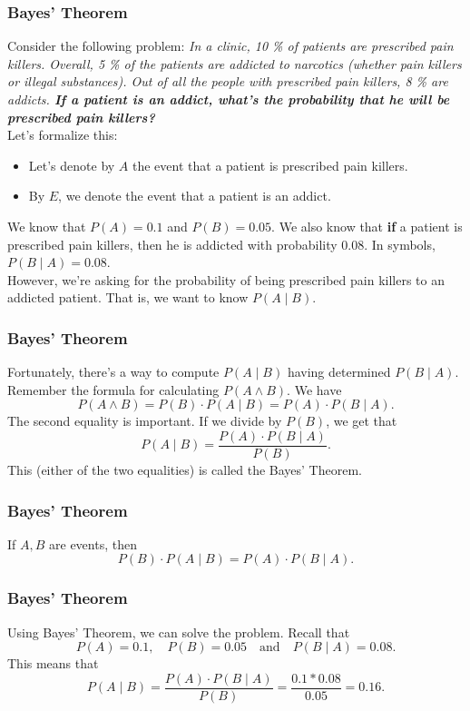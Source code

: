 \documentclass[aspectratio=169,11pt,usenames,dvipsnames,handout]{beamer}
\begin{document}
\begin{frame}
 \frametitle{Bayes' Theorem}
 Consider the following problem:
 \emph{In a clinic, 10 \% of patients are prescribed pain killers. Overall, 5 \%
  of the patients are addicted to narcotics (whether pain killers or illegal
  substances). Out of all the people with prescribed pain killers, 8 \% are
  addicts. \textbf{If a patient is an addict, what's the probability that he
  will be prescribed pain killers?}}\\
  \pause
  Let's formalize this:
  \begin{itemize}
   \item Let's denote by $A$ the event that a patient is prescribed pain
    killers.
   \pause
   \item By $E$, we denote the event that a patient is an addict.
  \end{itemize}
  We know that $P(A) = 0.1$ and $P(B) = 0.05$. \pause
  We also know that \textbf{if} a patient is prescribed pain killers, then he is
  addicted with probability 0.08. In symbols, $P(B \mid A) = 0.08$.\\\pause
  However, we're asking for the probability of being prescribed pain killers to
  an addicted patient. That is, we want to know $P(A \mid B)$.
\end{frame}
\begin{frame}
 \frametitle{Bayes' Theorem}
 Fortunately, there's a way to compute $P(A \mid B)$ having determined $P(B \mid
 A)$.\\
 \pause
 Remember the formula for calculating $P(A \wedge B)$. We have
 \[
  P(A \wedge B) = P(B) \cdot P(A \mid B) = P(A) \cdot P(B \mid A).
 \]
 \pause
 The second equality is important. If we divide by $P(B)$, we get that
 \[
  P(A \mid B) = \frac{P(A) \cdot P(B \mid A)}{P(B)}.
 \]
 \pause
 This (either of the two equalities) is called the \alert{Bayes' Theorem}.
\end{frame}
\begin{frame}
 \frametitle{Bayes' Theorem}
 \begin{tcolorbox}[title=Bayes' Theorem]
  If $A,B$ are events, then
  \[
  P(B) \cdot P(A \mid B) = P(A) \cdot P(B \mid A).
  \]
 \end{tcolorbox}
\end{frame}
\begin{frame}
 \frametitle{Bayes' Theorem}
 Using Bayes' Theorem, we can solve the problem. Recall that
 \[
  P(A) = 0.1, \quad P(B) = 0.05 \quad \text{and} \quad P(B \mid A) = 0.08.
 \]
 \pause
 This means that
 \[
  P(A \mid B) = \frac{P(A) \cdot P(B \mid A)}{P(B)} = \frac{0.1 * 0.08}{0.05} =
  0.16.
 \]
\end{frame}
\end{document}
